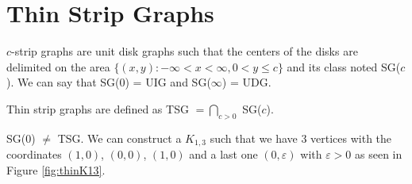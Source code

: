 
\section{Thin Strip Graphs}
\label{sec:thin}


$c$-strip graphs are unit disk graphs such that the centers of the disks are delimited on the area $\{(x,y) : -\infty < x < \infty, 0 < y \leq c\}$ and its class noted SG($c$). We can say that SG(0) = UIG and SG($\infty$) = UDG. \cite{hayashiThinStripGraphs2017}

\begin{defn}
  Thin strip graphs are defined as TSG $= \bigcap_{c > 0}$ SG($c$).
\end{defn}

\begin{remark}
  SG($0$) $\neq$ TSG. We can construct a $K_{1,3}$ such that we have 3 vertices with the coordinates
  $(1,0)$, $(0,0)$, $(1,0)$ and a last one $(0,\varepsilon)$ with $\varepsilon > 0$ as seen in Figure \ref{fig:thinK13}.
\end{remark}



